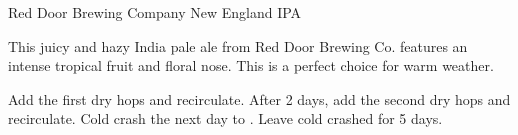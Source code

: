 \begin{recipie}{Red Door Brewing Company New England IPA}

\begin{aboutblock}
This juicy and hazy India pale ale from Red Door Brewing Co. features an intense
tropical fruit and floral nose. This is a perfect choice for warm weather.
\end{aboutblock}


\begin{methodandtiming}
 
\begin{mashsteps}
\end{mashsteps}

\begin{fermentationsteps}
\end{fermentationsteps}

\begin{directions}
Add the first dry hops and recirculate. After 2 days, add the second dry hops
and recirculate. Cold crash the next day to . Leave cold crashed
for 5 days.
\end{directions}

\end{methodandtiming}

\pagebreak

\begin{ingredientsblock}

\begin{malts}
\end{malts}

\begin{hops}
\end{hops}

\begin{yeasts}
\end{yeasts}

\end{ingredientsblock}

\end{recipie}

